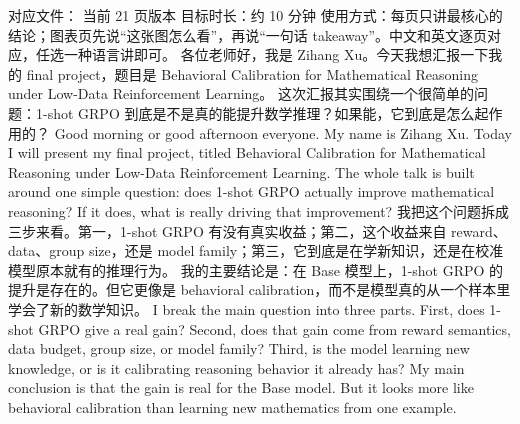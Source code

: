 \markdownRendererDocumentBegin
{}\markdownRendererInterblockSeparator
{}对应文件： 当前 21 页版本\markdownRendererLineBreak
{}目标时长：约 10 分钟\markdownRendererLineBreak
{}使用方式：每页只讲最核心的结论；图表页先说“这张图怎么看”，再说“一句话 takeaway”。中文和英文逐页对应，任选一种语言讲即可。\markdownRendererInterblockSeparator
{}\markdownRendererHorizontalRule{}\markdownRendererInterblockSeparator
{}\markdownRendererInterblockSeparator
{}\markdownRendererInterblockSeparator
{}各位老师好，我是 Zihang Xu。今天我想汇报一下我的 final project，题目是 Behavioral Calibration for Mathematical Reasoning under Low-Data Reinforcement Learning。\markdownRendererInterblockSeparator
{}这次汇报其实围绕一个很简单的问题：1-shot GRPO 到底是不是真的能提升数学推理？如果能，它到底是怎么起作用的？\markdownRendererInterblockSeparator
{}\markdownRendererInterblockSeparator
{}Good morning or good afternoon everyone. My name is Zihang Xu. Today I will present my final project, titled Behavioral Calibration for Mathematical Reasoning under Low-Data Reinforcement Learning.\markdownRendererInterblockSeparator
{}The whole talk is built around one simple question: does 1-shot GRPO actually improve mathematical reasoning? If it does, what is really driving that improvement?\markdownRendererInterblockSeparator
{}\markdownRendererHorizontalRule{}\markdownRendererInterblockSeparator
{}\markdownRendererInterblockSeparator
{}\markdownRendererInterblockSeparator
{}我把这个问题拆成三步来看。第一，1-shot GRPO 有没有真实收益；第二，这个收益来自 reward、data、group size，还是 model family；第三，它到底是在学新知识，还是在校准模型原本就有的推理行为。\markdownRendererInterblockSeparator
{}我的主要结论是：在 Base 模型上，1-shot GRPO 的提升是存在的。但它更像是 behavioral calibration，而不是模型真的从一个样本里学会了新的数学知识。\markdownRendererInterblockSeparator
{}\markdownRendererInterblockSeparator
{}I break the main question into three parts. First, does 1-shot GRPO give a real gain? Second, does that gain come from reward semantics, data budget, group size, or model family? Third, is the model learning new knowledge, or is it calibrating reasoning behavior it already has?\markdownRendererInterblockSeparator
{}My main conclusion is that the gain is real for the Base model. But it looks more like behavioral calibration than learning new mathematics from one example.\markdownRendererInterblockSeparator
